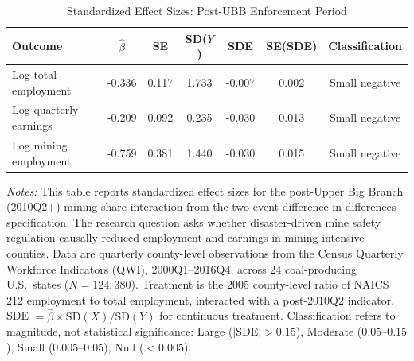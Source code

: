 \begin{table}[htbp]
\centering
\caption{Standardized Effect Sizes: Post-UBB Enforcement Period}
\label{tab:sde}
\begin{threeparttable}
\begin{tabular}{lcccccc}
\toprule
Outcome & $\hat{\beta}$ & SE & SD($Y$) & SDE & SE(SDE) & Classification \\
\midrule
Log total employment & -0.336 & 0.117 & 1.733 & -0.007 & 0.002 & Small negative \\
Log quarterly earnings & -0.209 & 0.092 & 0.235 & -0.030 & 0.013 & Small negative \\
Log mining employment & -0.759 & 0.381 & 1.440 & -0.030 & 0.015 & Small negative \\
\bottomrule
\end{tabular}
\begin{tablenotes}[flushleft]
\small
\item \textit{Notes:} This table reports standardized effect sizes for the post-Upper Big Branch (2010Q2+) mining share interaction from the two-event difference-in-differences specification. The research question asks whether disaster-driven mine safety regulation causally reduced employment and earnings in mining-intensive counties. Data are quarterly county-level observations from the Census Quarterly Workforce Indicators (QWI), 2000Q1--2016Q4, across 24 coal-producing U.S.\ states ($N = 124{,}380$). Treatment is the 2005 county-level ratio of NAICS 212 employment to total employment, interacted with a post-2010Q2 indicator. SDE $= \hat{\beta} \times \text{SD}(X) / \text{SD}(Y)$ for continuous treatment. Classification refers to magnitude, not statistical significance: Large ($|$SDE$| > 0.15$), Moderate ($0.05$--$0.15$), Small ($0.005$--$0.05$), Null ($< 0.005$).
\end{tablenotes}
\end{threeparttable}
\end{table}
